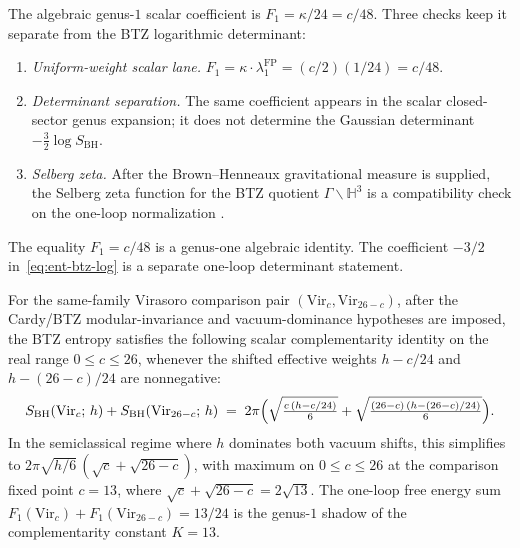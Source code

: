 \begin{remark}
\label{rem:ent-btz-three-routes}
The algebraic genus-$1$ scalar coefficient is
$F_1=\kappa/24=c/48$.  Three checks keep it separate from the BTZ
logarithmic determinant:
\begin{enumerate}[label=(\alph*)]
\item \emph{Uniform-weight scalar lane.}
 $F_1 = \kappa\cdot\lambda_1^{\mathrm{FP}}
 = (c/2)(1/24)=c/48$.
\item \emph{Determinant separation.}
 The same coefficient appears in the scalar closed-sector genus
 expansion; it does not determine the Gaussian determinant
 $-\tfrac32\log S_{\mathrm{BH}}$.
\item \emph{Selberg zeta.}
 After the Brown--Henneaux gravitational measure is supplied, the
 Selberg zeta function for the BTZ quotient
 $\Gamma \backslash \mathbb{H}^3$ is a compatibility check on the
 one-loop normalization
 \cite{Patterson-Perry01}.
\end{enumerate}
The equality $F_1=c/48$ is a genus-one algebraic identity.  The
coefficient $-3/2$ in~\eqref{eq:ent-btz-log} is a separate
one-loop determinant statement.
\end{remark}

\begin{proposition}
\label{prop:ent-btz-complementarity}
For the same-family Virasoro comparison pair
$(\mathrm{Vir}_c, \mathrm{Vir}_{26-c})$, after the Cardy/BTZ
modular-invariance and vacuum-dominance hypotheses are imposed, the
BTZ entropy satisfies the following scalar complementarity identity on
the real range \(0\le c\le26\), whenever the shifted effective weights
\(h-c/24\) and \(h-(26-c)/24\) are nonnegative:
\begin{equation}\label{eq:ent-btz-complementarity}
S_{\mathrm{BH}}(\mathrm{Vir}_c;\, h)
+ S_{\mathrm{BH}}(\mathrm{Vir}_{26-c};\, h)
\;=\;
2\pi\Bigl(
 \sqrt{\tfrac{c\,(h - c/24)}{6}}
 + \sqrt{\tfrac{(26-c)\,(h - (26-c)/24)}{6}}
\Bigr).
\end{equation}
In the semiclassical regime where \(h\) dominates both vacuum shifts,
this simplifies to
$2\pi\sqrt{h/6}\,(\sqrt{c} + \sqrt{26-c})$,
with maximum on \(0\le c\le26\) at the comparison fixed point
\(c = 13\),
where $\sqrt{c} + \sqrt{26-c} = 2\sqrt{13}$.
The one-loop free energy sum
$F_1(\mathrm{Vir}_c) + F_1(\mathrm{Vir}_{26-c})
= 13/24$
is the genus-$1$ shadow of the complementarity constant
$K = 13$.
\end{proposition}

